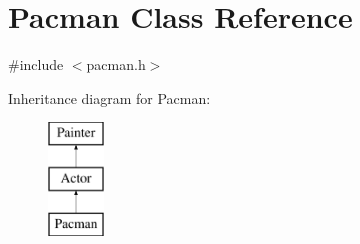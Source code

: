 \hypertarget{class_pacman}{}\section{Pacman Class Reference}
\label{class_pacman}


{\ttfamily \#include $<$pacman.\+h$>$}

Inheritance diagram for Pacman\+:\begin{figure}[H]
\begin{center}
\leavevmode
\includegraphics[height=3.000000cm]{class_pacman}
\end{center}
\end{figure}
